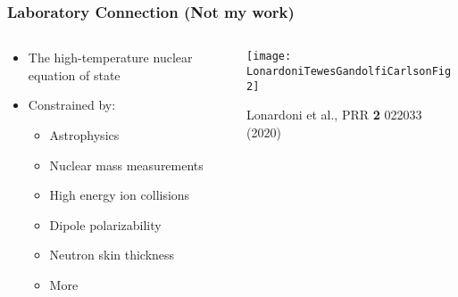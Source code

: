 \documentclass[]{beamer}
\begin{document}
\begin{frame}
\begin{columns}
\begin{column}{6cm}
{
      }
    \end{column}
  \end{columns}
\end{frame}

\begin{frame}
  \frametitle{Laboratory Connection (Not my work)}
  \begin{columns}
    \begin{column}{6cm}
      \begin{itemize}
      \item The high-temperature nuclear equation of state
      \item Constrained by:
        \begin{itemize}
        \item Astrophysics
        \item Nuclear mass measurements
        \item High energy ion collisions
        \item Dipole polarizability
        \item Neutron skin thickness
        \item More
        \end{itemize}
      \end{itemize}
    \end{column}
    \begin{column}{6cm}
      \begin{center}
        \texttt{[image: LonardoniTewesGandolfiCarlsonFig2]}
      \end{center}
      Lonardoni et al., PRR \textbf{2} 022033 (2020)
    \end{column}
  \end{columns}
\end{frame}
\end{document}

